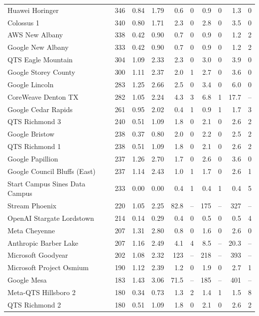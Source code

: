 {\begin{longtable}{@{}lrrrrrrrrr@{}}
Huawei Horinger & 346 & 0.84 & 1.79 & 0.6 & 0 & 0.9 & 0 & 1.3 & 0 \\
Colossus 1 & 340 & 0.80 & 1.71 & 2.3 & 0 & 2.8 & 0 & 3.5 & 0 \\
AWS New Albany & 338 & 0.42 & 0.90 & 0.7 & 0 & 0.9 & 0 & 1.2 & 2 \\
Google New Albany & 333 & 0.42 & 0.90 & 0.7 & 0 & 0.9 & 0 & 1.2 & 2 \\
QTS Eagle Mountain & 304 & 1.09 & 2.33 & 2.3 & 0 & 3.0 & 0 & 3.9 & 0 \\
Google Storey County & 300 & 1.11 & 2.37 & 2.0 & 1 & 2.7 & 0 & 3.6 & 0 \\
Google Lincoln & 283 & 1.25 & 2.66 & 2.5 & 0 & 3.4 & 0 & 6.0 & 0 \\
CoreWeave Denton TX & 282 & 1.05 & 2.24 & 4.3 & 3 & 6.8 & 1 & 17.7 & -- \\
Google Cedar Rapids & 261 & 0.95 & 2.02 & 0.4 & 1 & 0.9 & 1 & 1.7 & 3 \\
QTS Richmond 3 & 240 & 0.51 & 1.09 & 1.8 & 0 & 2.1 & 0 & 2.6 & 2 \\
Google Bristow & 238 & 0.37 & 0.80 & 2.0 & 0 & 2.2 & 0 & 2.5 & 2 \\
QTS Richmond 1 & 238 & 0.51 & 1.09 & 1.8 & 0 & 2.1 & 0 & 2.6 & 2 \\
Google Papillion & 237 & 1.26 & 2.70 & 1.7 & 0 & 2.6 & 0 & 3.6 & 0 \\
Google Council Bluffs (East) & 237 & 1.14 & 2.43 & 1.0 & 1 & 1.7 & 0 & 2.6 & 1 \\
Start Campus Sines Data Campus & 233 & 0.00 & 0.00 & 0.4 & 1 & 0.4 & 1 & 0.4 & 5 \\
Stream Phoenix & 220 & 1.05 & 2.25 & 82.8 & -- & 175 & -- & 327 & -- \\
OpenAI Stargate Lordstown & 214 & 0.14 & 0.29 & 0.4 & 0 & 0.5 & 0 & 0.5 & 4 \\
Meta Cheyenne & 207 & 1.31 & 2.80 & 0.8 & 0 & 1.6 & 0 & 2.6 & 0 \\
Anthropic Barber Lake & 207 & 1.16 & 2.49 & 4.1 & 4 & 8.5 & -- & 20.3 & -- \\
Microsoft Goodyear & 202 & 1.08 & 2.32 & 123 & -- & 218 & -- & 393 & -- \\
Microsoft Project Osmium & 190 & 1.12 & 2.39 & 1.2 & 0 & 1.9 & 0 & 2.7 & 1 \\
Google Mesa & 183 & 1.43 & 3.06 & 71.5 & -- & 185 & -- & 401 & -- \\
Meta-QTS Hillsboro 2 & 180 & 0.34 & 0.73 & 1.3 & 2 & 1.4 & 1 & 1.5 & 8 \\
QTS Richmond 2 & 180 & 0.51 & 1.09 & 1.8 & 0 & 2.1 & 0 & 2.6 & 2 \\

\end{longtable}}
